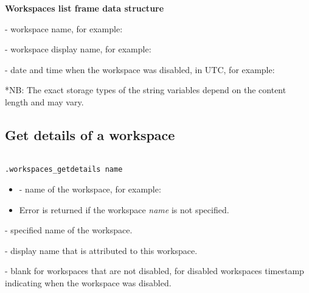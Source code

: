 \textbf{Workspaces list frame data structure}

\begin{compactitem}

      - workspace name, for example:

     - workspace display name, for example:

     - date and time when the workspace
    was disabled, in UTC, for example:

\end{compactitem}

*NB: The exact storage types of the string variables depend on the content
     length and may vary.


\subsection{Get details of a workspace}

\begin{lstlisting}[style=CommandLineStyle, showlines=true]

.workspaces_getdetails name

\end{lstlisting}

\paramsheader
\begin{itemize}

    \item {} - name of the workspace, for example:

\end{itemize}

\errheader
\begin{itemize}
    \item Error  is returned if the workspace \textit{name} is
    not specified.
\end{itemize}

\savedres
\begin{compactitem}

    \item {} - specified name of the workspace.

    \item {} - display name that is attributed to
    this workspace.

    \item {} - blank for workspaces that are not
    disabled, for disabled workspaces timestamp indicating when the workspace
    was disabled.

\end{compactitem}


